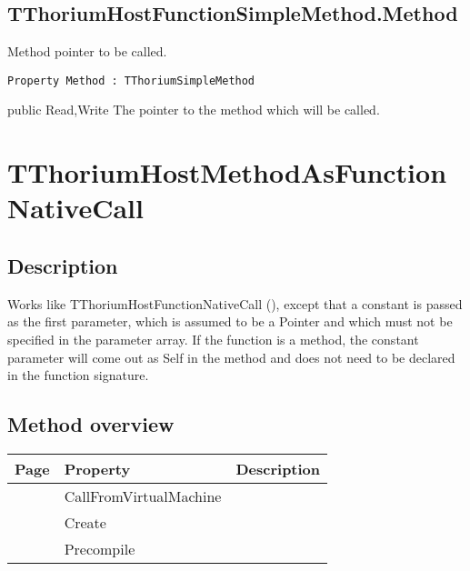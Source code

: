 \subsection{TThoriumHostFunctionSimpleMethod.Method}
\label{thoriumcorepkg:thorium:tthoriumhostfunctionsimplemethod:method}
\begin{FPCList}
\Synopsis
Method pointer to be called.\Declaration 

\begin{verbatim}
Property Method : TThoriumSimpleMethod
\end{verbatim}
\Visibility
public
\Access
Read,Write
\Description
The pointer to the method which will be called.\end{FPCList}
\section{TThoriumHostMethodAsFunctionNativeCall}
\label{thoriumcorepkg:thorium:tthoriumhostmethodasfunctionnativecall}
\subsection{Description}
Works like TThoriumHostFunctionNativeCall (\pageref{thoriumcorepkg:thorium:tthoriumhostfunctionnativecall}), except that a constant is passed as the first parameter, which is assumed to be a Pointer and which must not be specified in the parameter array. If the function is a method, the constant parameter will come out as Self in the method and does not need to be declared in the function signature.%
\subsection{Method overview}
\label{thoriumcorepkg:thorium:tthoriumhostmethodasfunctionnativecall:methods}
\begin{tabularx}{\textwidth}{llX}
Page & Property & Description  \\ \hline
\pageref{thoriumcorepkg:thorium:tthoriumhostmethodasfunctionnativecall:callfromvirtualmachine} & CallFromVirtualMachine  &  \\
\pageref{thoriumcorepkg:thorium:tthoriumhostmethodasfunctionnativecall:create} & Create  &  \\
\pageref{thoriumcorepkg:thorium:tthoriumhostmethodasfunctionnativecall:precompile} & Precompile  &  \\
\hline
\end{tabularx}
